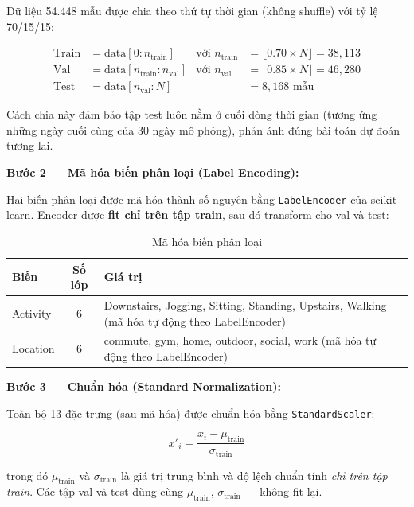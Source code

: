Dữ liệu 54.448 mẫu được chia theo thứ tự thời gian (không shuffle) với tỷ lệ 70/15/15:

\begin{equation}
\label{eq:data_split}
\begin{aligned}
\text{Train} &= \text{data}[0 : n_{\text{train}}] & \text{với } n_{\text{train}} &= \lfloor 0.70 \times N \rfloor = 38{,}113 \\
\text{Val}   &= \text{data}[n_{\text{train}} : n_{\text{val}}] & \text{với } n_{\text{val}} &= \lfloor 0.85 \times N \rfloor = 46{,}280 \\
\text{Test}  &= \text{data}[n_{\text{val}} : N] & & = 8{,}168 \text{ mẫu}
\end{aligned}
\end{equation}

Cách chia này đảm bảo tập test luôn nằm ở cuối dòng thời gian (tương ứng những ngày cuối cùng của 30 ngày mô phỏng), phản ánh đúng bài toán dự đoán tương lai.

\textbf{Bước 2 — Mã hóa biến phân loại (Label Encoding):}

Hai biến phân loại được mã hóa thành số nguyên bằng \texttt{LabelEncoder} của scikit-learn. Encoder được \textbf{fit chỉ trên tập train}, sau đó transform cho val và test:

\begin{table}[H]
\centering
\caption{Mã hóa biến phân loại}
\label{tab:label_encoding}
\small
\begin{tabular}{|l|c|l|}
\hline
\textbf{Biến} & \textbf{Số lớp} & \textbf{Giá trị} \\
\hline
Activity & 6 & Downstairs, Jogging, Sitting, Standing, Upstairs, Walking (mã hóa tự động theo LabelEncoder) \\
Location & 6 & commute, gym, home, outdoor, social, work (mã hóa tự động theo LabelEncoder) \\
\hline
\end{tabular}
\end{table}

\textbf{Bước 3 — Chuẩn hóa (Standard Normalization):}

Toàn bộ 13 đặc trưng (sau mã hóa) được chuẩn hóa bằng \texttt{StandardScaler}:

\begin{equation}
\label{eq:standardscaler}
x'_i = \frac{x_i - \mu_{\text{train}}}{\sigma_{\text{train}}}
\end{equation}

\noindent trong đó $\mu_{\text{train}}$ và $\sigma_{\text{train}}$ là giá trị trung bình và độ lệch chuẩn tính \textit{chỉ trên tập train}. Các tập val và test dùng cùng $\mu_{\text{train}}$, $\sigma_{\text{train}}$ — không fit lại.

